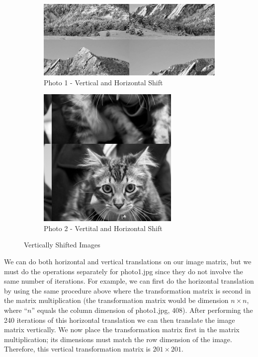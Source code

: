 \begin{figure}[ht]
  \centering
  \begin{subfigure}{\textwidth}
    \centering
    \includegraphics[scale=0.4]{./img/vhsg1.png}
    \caption{Photo 1 - Vertical and
    Horizontal Shift}
    \label{fig:p1vg}
  \end{subfigure}
  \begin{subfigure}{\textwidth}
    \centering
    \includegraphics[scale=0.4]{./img/vhsg2.png}
    \caption{Photo
      2
      -
      Vertital
      and
      Horizontal
    Shift}
    \label{fig:p2vg}
  \end{subfigure}
  \caption{Vertically
    Shifted
  Images}
  \label{fig:vs_images}
\end{figure}

We can do both horizontal and vertical translations on our image matrix, but we must do the operations separately for photo1.jpg since they do not involve the same number of iterations. For example, we can first do the horizontal translation by using the same procedure above where the transformation matrix is second in the matrix multiplication (the transformation matrix would be dimension $n \times n$, where “$n$” equals the column dimension of photo1.jpg, 408). After performing the 240 iterations of this horizontal translation we can then translate the image matrix vertically. We now place the transformation matrix first in the matrix multiplication; its dimensions must match the row dimension of the image. Therefore, this vertical transformation matrix is $201\times 201$.
